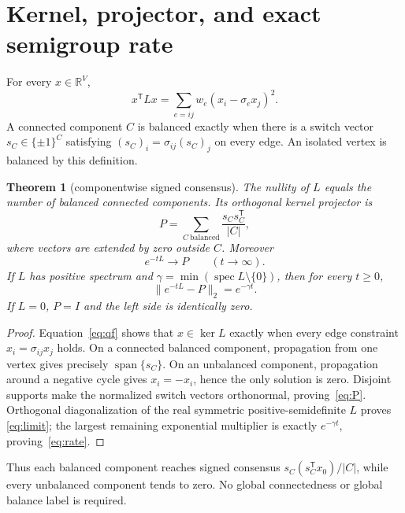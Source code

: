 \documentclass[9pt]{extarticle}
\newtheorem{theorem}{Theorem}
\begin{document}
\section{Kernel, projector, and exact semigroup rate}
For every $x\in\mathbb R^V$,
\begin{equation}\label{eq:qf}
 x^{\mathsf T}Lx=\sum_{e=ij}w_e(x_i-\sigma_e x_j)^2.
\end{equation}
A connected component $C$ is balanced exactly when there is a switch vector
$s_C\in\{\pm1\}^C$ satisfying $(s_C)_i=\sigma_{ij}(s_C)_j$ on every edge.
An isolated vertex is balanced by this definition.

\begin{theorem}[componentwise signed consensus]\label{thm:consensus}
The nullity of $L$ equals the number of balanced connected components.  Its
orthogonal kernel projector is
\begin{equation}\label{eq:P}
 P=\sum_{C\ \mathrm{balanced}}\frac{s_Cs_C^{\mathsf T}}{|C|},
\end{equation}
where vectors are extended by zero outside $C$.  Moreover
\begin{equation}\label{eq:limit}
 e^{-tL}\longrightarrow P \qquad(t\to\infty).
\end{equation}
If $L$ has positive spectrum and $\gamma=\min(\operatorname{spec}L\setminus
\{0\})$, then for every $t\ge0$,
\begin{equation}\label{eq:rate}
 \|e^{-tL}-P\|_2=e^{-\gamma t}.
\end{equation}
If $L=0$, $P=I$ and the left side is identically zero.
\end{theorem}
\begin{proof}
Equation~\eqref{eq:qf} shows that $x\in\ker L$ exactly when every edge
constraint $x_i=\sigma_{ij}x_j$ holds.  On a connected balanced component,
propagation from one vertex gives precisely $\operatorname{span}\{s_C\}$.
On an unbalanced component, propagation around a negative cycle gives
$x_i=-x_i$, hence the only solution is zero.  Disjoint supports make the
normalized switch vectors orthonormal, proving~\eqref{eq:P}.  Orthogonal
diagonalization of the real symmetric positive-semidefinite $L$ proves
\eqref{eq:limit}; the largest remaining exponential multiplier is exactly
$e^{-\gamma t}$, proving~\eqref{eq:rate}.
\end{proof}

Thus each balanced component reaches signed consensus
$s_C(s_C^{\mathsf T}x_0)/|C|$, while every unbalanced component tends to zero.
No global connectedness or global balance label is required.
\end{document}
